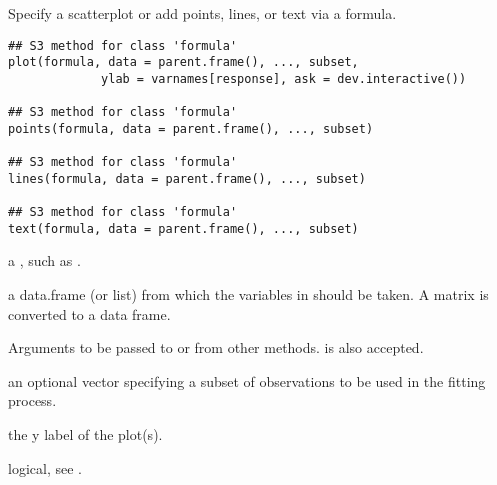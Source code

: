 %
\begin{Description}\relax
Specify a scatterplot or add points, lines, or text via a formula.
\end{Description}
%
\begin{Usage}
\begin{verbatim}
## S3 method for class 'formula'
plot(formula, data = parent.frame(), ..., subset,
             ylab = varnames[response], ask = dev.interactive())

## S3 method for class 'formula'
points(formula, data = parent.frame(), ..., subset)

## S3 method for class 'formula'
lines(formula, data = parent.frame(), ..., subset)

## S3 method for class 'formula'
text(formula, data = parent.frame(), ..., subset)
\end{verbatim}
\end{Usage}
%
\begin{Arguments}
\begin{ldescription}
\item[\code{formula}] a , such as .
\item[\code{data}] a data.frame (or list) from which the variables in
 should be taken.  A matrix is converted to a data frame.
\item[\code{...}] Arguments to be passed to or from other methods.
 is also accepted.
\item[\code{subset}] an optional vector specifying a subset of observations
to be used in the fitting process.
\item[\code{ylab}] the y label of the plot(s).
\item[\code{ask}] logical, see .
\end{ldescription}
\end{Arguments}
%
